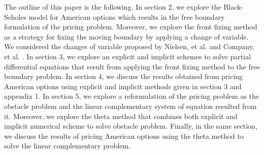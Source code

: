 The outline of this paper is the following. In section 2, we explore the 
Black-Scholes model for American options which results in the free boundary 
formulation of the pricing problem. Moreover, we explore the front fixing method
as a strategy for fixing the moving boundary by applying a change of variable. 
We considered the changes of variable proposed by Nielsen, et al. \cite*{nielsen_2001} 
and Company, et al. \cite*{company_egorova_jodar_2014}. In section 3, we explore
an explicit and implicit schemes to solve partial differential equations that 
result from applying the front fixing method to the free boundary problem. 
In section 4, we discuss the results obtained from pricing American options using
explicit and implicit methods given in section 3 and appendix 1. In section 5, 
we explore a reformulation of the pricing problem as the obstacle problem and 
the linear complementary system of equation resulted from it. Moreover, we 
explore the theta method that combines both explicit and implicit numerical 
scheme to solve obstacle problem. Finally, in the same section, we discuss the 
results of pricing American options using the theta method to solve the linear 
complementary problem.

